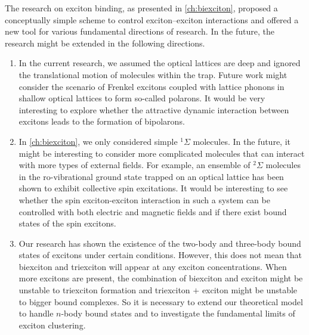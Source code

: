 %
%
%

The research on exciton binding, as presented in \autoref{ch:biexciton}, proposed a conceptually simple scheme to control 
exciton--exciton interactions and offered a new tool for various fundamental directions of research. In the future, the research might be extended in the following directions.
\begin{enumerate}
%
\item In the current research, we 
assumed the optical lattices are deep and ignored the translational motion of molecules within the trap. Future work might 
consider the scenario of Frenkel excitons coupled with lattice phonons in shallow optical lattices to form so-called polarons. It would be very interesting to explore whether the attractive dynamic interaction 
between excitons leads to the formation of bipolarons. 
%
\item In \autoref{ch:biexciton}, we only considered  simple 
$^{1}\Sigma$ molecules. In the future, it might be interesting to consider more complicated molecules that can interact 
with more types of external fields. For example, an ensemble of $^{2}\Sigma$ molecules in the ro-vibrational
ground state trapped on an optical lattice has been shown to exhibit collective spin excitations. It would be interesting to 
see whether the spin exciton-exciton interaction in such a system can be controlled with both electric and magnetic fields and if there exist
bound states of the spin excitons. 
%
\item Our research has shown the existence of  the two-body and three-body bound states of excitons under certain 
conditions. However, this does not mean that biexciton and triexciton will appear at any exciton concentrations. 
When more excitons are present, the combination of biexciton and exciton might be unstable to triexciton formation
and triexciton $+$ exciton might be unstable to bigger bound complexes.  So it is necessary to extend our theoretical
model to handle $n$-body bound states and to investigate the fundamental limits of exciton clustering. 
\end{enumerate}

